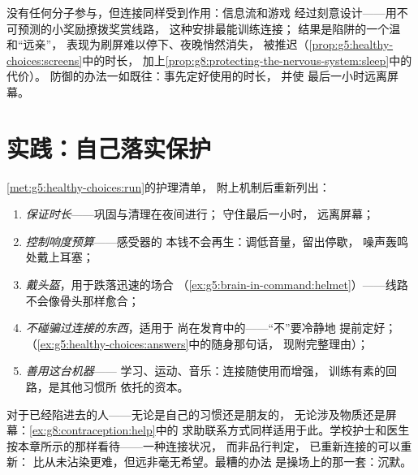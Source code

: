 \begin{example}[屏幕的循环]\label{ex:g8:protecting-the-nervous-system:screens}
没有任何分子参与，但连接同样受到作用：信息流和游戏
经过刻意设计——用不可预测的小奖励撩拨奖赏线路，
这种安排最能训练连接；
结果是陷阱的一个温和“远亲”，
表现为刷屏难以停下、夜晚悄然消失，
被推迟（\cref{prop:g5:healthy-choices:screens}中的时长，
加上\cref{prop:g8:protecting-the-nervous-system:sleep}中的代价）。
防御的办法一如既往：事先定好使用的时长，
并使
最后一小时远离屏幕。
\end{example}

\section{实践：自己落实保护}

\begin{method}[神经系统使用说明书]\label{met:g8:protecting-the-nervous-system:manual}
\cref{met:g5:healthy-choices:run}的护理清单，
附上机制后重新列出：
\begin{enumerate}
  \item \emph{保证时长}——巩固与清理在夜间进行；
        守住最后一小时，
        远离屏幕；
  \item \emph{控制响度预算}——感受器的
        本钱不会再生：调低音量，留出停歇，
        噪声轰鸣处戴上耳塞；
  \item \emph{戴头盔}，用于跌落迅速的场合
        （\cref{ex:g5:brain-in-command:helmet}）——线路
        不会像骨头那样愈合；
  \item \emph{不碰骗过连接的东西}，适用于
        尚在发育中的——“不”要冷静地
        提前定好；
        （\cref{ex:g5:healthy-choices:answers}中的随身那句话，
        现附完整理由）；
  \item \emph{善用这台机器}——
        学习、运动、音乐：连接随使用而增强，
        训练有素的回路，是其他习惯所
        依托的资本。
\end{enumerate}
\end{method}

\begin{example}\label{ex:g8:protecting-the-nervous-system:help}
对于已经陷进去的人——无论是自己的习惯还是朋友的，
无论涉及物质还是屏幕：\cref{ex:g8:contraception:help}中的
求助联系方式同样适用于此。学校护士和医生
按本章所示的那样看待——一种连接状况，
而非品行判定，
已重新连接的可以重新：
比从未沾染更难，但远非毫无希望。最糟的办法
是操场上的那一套：沉默。
\end{example}

